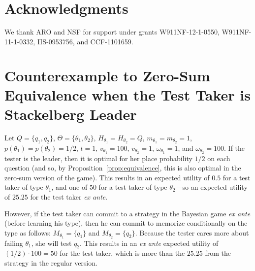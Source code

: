 \documentclass{article}
\begin{document}
\section*{Acknowledgments}
We thank ARO and NSF for support under grants W911NF-12-1-0550,
W911NF-11-1-0332, IIS-0953756, and CCF-1101659.


\appendix

\section{Counterexample to Zero-Sum Equivalence when the Test Taker is
  Stackelberg Leader}
\label{se:counterexample}

Let $Q=\{q_1,q_2\}$, $\Theta=\{\theta_1,\theta_2\}$,
$H_{\theta_1}=H_{\theta_2}=Q$, $m_{\theta_1}=m_{\theta_2}=1$,
$p(\theta_1)=p(\theta_2)=1/2$, $t=1$, $v_{\theta_1} = 100$, $v_{\theta_2} =
1$, $\omega_{\theta_1} = 1$, and $\omega_{\theta_2} = 100$.  If the tester
is the leader, then it is optimal for her place probability $1/2$ on each
question (and so, by Proposition~\ref{prop:equivalence}, this is also
optimal in the zero-sum version of the game).  This results in an expected
utility of $0.5$ for a test taker of type $\theta_1$, and one of $50$ for a
test taker of type $\theta_2$---so an expected utility of $25.25$ for the
test taker {\em ex ante}.

However, if the test taker can commit to a strategy in the Bayesian game
{\em ex ante} (before learning his type), then he can commit to
memorize conditionally on the type as follows: $M_{\theta_1} =\{q_1\}$ and 
$M_{\theta_2} =\{q_2\}$.  Because the tester cares more about failing
$\theta_1$, she will test $q_2$.  This results in an {\em ex ante} expected
utility of $(1/2) \cdot 100 = 50$ for the test taker, which is more than
the $25.25$ from the strategy in the regular version.

















\end{document}
